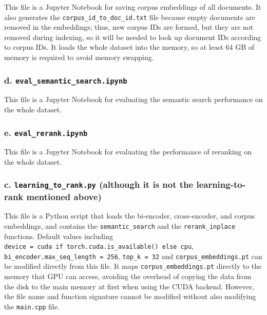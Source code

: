 \documentclass[11pt]{article}
\begin{document}
This file is a Jupyter Notebook for saving corpus embeddings of all
documents. It also generates the \texttt{corpus\_id\_to\_doc\_id.txt}
file because empty documents are removed in the embeddings; thus, new
corpus IDs are formed, but they are not removed during indexing, so it
will be needed to look up document IDs according to corpus IDs. It loads
the whole dataset into the memory, so at least 64 GB of memory is
required to avoid memory swapping.

\hypertarget{d-evalsemanticsearchipynb}{%
\subsubsection{d.
\texttt{eval\_semantic\_search.ipynb}}\label{d-evalsemanticsearchipynb}}

This file is a Jupyter Notebook for evaluating the semantic search
performance on the whole dataset.

\hypertarget{e-evalrerankipynb}{%
\subsubsection{e.
\texttt{eval\_rerank.ipynb}}\label{e-evalrerankipynb}}

This file is a Jupyter Notebook for evaluating the performance of
reranking on the whole dataset.

\hypertarget{c-learningtorankpy}{%
\subsubsection{c. \texttt{learning\_to\_rank.py} (although
it is not the learning-to-rank mentioned
above)}\label{c-learningtorankpy}}

This file is a Python script that loads the bi-encoder, cross-encoder,
and corpus embeddings, and contains the \texttt{semantic\_search} and
the \texttt{rerank\_inplace} functions. Default values including
\texttt{device\ =\ \textquotesingle{}cuda\textquotesingle{}\ if\ torch.cuda.is\_available()\ else\ \textquotesingle{}cpu\textquotesingle{}},
\texttt{bi\_encoder.max\_seq\_length\ =\ 256}, \texttt{top\_k\ =\ 32}
and \texttt{corpus\_embeddings.pt} can be modified directly from this
file. It maps \texttt{corpus\_embeddings.pt} directly to the memory that
GPU can access, avoiding the overhead of copying the data from the disk
to the main memory at first when using the CUDA backend. However, the
file name and function signature cannot be modified without also
modifying the \texttt{main.cpp} file.
\end{document}
